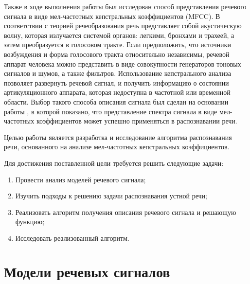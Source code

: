 \documentclass[a4paper,14pt,russian,utf8,nocolumnsxix,nocolumnxxxi,nocolumnxxxii]{eskdtext}
\begin{document}
Также в ходе выполнения работы был исследован способ представления речевого сигнала в виде мел-частотных кепстральных коэффициентов (MFCC). В соответствии с теорией речеобразования \cite{agran,rabiner1,sorokin} речь представляет собой акустическую волну, которая излучается системой органов: легкими, бронхами и трахеей, а затем преобразуется в голосовом тракте. Если предположить, что источники возбуждения и форма голосового тракта относительно независимы, речевой аппарат человека можно представить в виде совокупности генераторов тоновых сигналов и шумов, а также фильтров. Использование кепстрального анализа позволяет развернуть речевой сигнал, и получить информацию о состоянии артикуляционного аппарата, которая недоступна в частотной или временной области. Выбор такого способа описания сигнала был сделан на основании работы \cite{davis}, в которой показано, что представление спектра сигнала в виде мел-частотных коэффициентов может успешно применяться в распознавании речи.

Целью работы является разработка и исследование алгоритма распознавания речи, основанного на анализе мел-частотных кепстральных коэффициентов.

Для достижения поставленной цели требуется решить следующие задачи:
\begin{enumerate}[1)]
	\item Провести анализ моделей речевого сигнала;
	\item Изучить подходы к решению задачи распознавания устной речи;
	\item Реализовать алгоритм получения описания речевого сигнала и решающую функцию;
	\item Исследовать реализованный алгоритм.
\end{enumerate}

\pagebreak

\section{Модели речевых сигналов}
\end{document}
